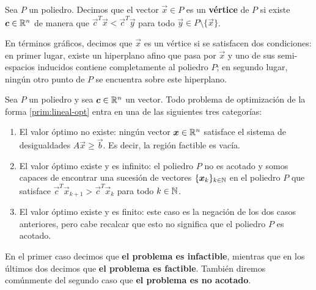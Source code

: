 \begin{definition}
	Sea $P$ un poliedro. Decimos que el vector $\vec{x} \in P$ es un \textbf{vértice} de $P$ si existe
	$\boldsymbol{c} \in \mathbb{R}^n$ de manera que $\vec{c}^T\vec{x} < \vec{c}^T\vec{y}$ para todo $\vec{y} \in P
	\setminus \lbrace \vec{x} \rbrace$.
\end{definition}
En términos gráficos, decimos que $\vec{x}$ es un vértice si se satisfacen dos condiciones: en
primer lugar, existe un hiperplano afino que pasa por $\vec{x}$ y uno de sus semi-espacios inducidos
contiene completamente al poliedro $P$; en segundo lugar, ningún otro punto de $P$ se encuentra
sobre este hiperplano.

\begin{definition}
Sea $P$ un poliedro y sea $\boldsymbol{c} \in \mathbb{R}^n$ un vector. Todo problema de optimización de la forma
\eqref{prim:lineal-opt} entra en una de las siguientes tres categorías:
\begin{enumerate}
	\item El valor óptimo no existe: ningún vector $\boldsymbol{x} \in \mathbb{R}^n$ satisface
		el sistema de desigualdades $A\vec{x} \geq \vec{b}$. Es decir, la región factible es vacía.
	\item El valor óptimo existe y es infinito: el poliedro $P$ no es acotado y
		somos capaces de encontrar una sucesión de vectores $\lbrace \boldsymbol{x}_k \rbrace_{k \in \mathbb{N}}$
		en el poliedro $P$ que satisface $\vec{c}^T\vec{x}_{k+1} > \vec{c}^T\vec{x}_k$ para todo $k \in \mathbb{N}$.
	\item El valor óptimo existe y es finito: este caso es la negación de los dos casos anteriores,
		pero cabe recalcar que esto no significa que el poliedro $P$ es acotado.
\end{enumerate}
En el primer caso decimos que \textbf{el problema es infactible}, mientras que en los últimos dos
decimos que \textbf{el problema es factible}. También diremos comúnmente del segundo caso que
\textbf{el problema es no acotado}.
\end{definition}

